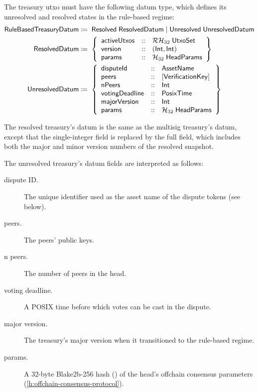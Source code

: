\documentclass[../hydrozoa.tex]{subfiles}
\begin{document}
The treasury utxo must have the following datum type, which defines its unresolved and resolved states in the rule-based regime:
\begin{equation*}
\begin{split}
  \mathsf{RuleBasedTreasuryDatum} &\coloneq\;
    \mathsf{Resolved} \; \mathsf{ResolvedDatum} \mid
    \mathsf{Unresolved} \; \mathsf{UnresolvedDatum} \\
  \mathsf{ResolvedDatum} &\coloneq\;\left\{
    \begin{array}{lll}
      \mathsf{activeUtxos}  &::& \mathcal{RH}_{32} \; \mathsf{UtxoSet} \\
      \mathsf{version} &::& (\mathsf{Int}, \mathsf{Int}) \\
      \mathsf{params} &::& \mathcal{H}_{32} \; \mathsf{HeadParams}
    \end{array}\right\} \\
  \mathsf{UnresolvedDatum} &\coloneq\;\left\{
    \begin{array}{lll}
      \mathsf{disputeId} &::& \mathsf{AssetName} \\
      \mathsf{peers} &::& \mathsf{[VerificationKey]} \\
      \mathsf{nPeers} &::& \mathsf{Int} \\
      \mathsf{votingDeadline} &::& \mathsf{PosixTime} \\
      \mathsf{majorVersion} &::& \mathsf{Int} \\
      \mathsf{params} &::& \mathcal{H}_{32} \; \mathsf{HeadParams}
    \end{array}\right\}
\end{split}
\end{equation*}

The resolved treasury's datum is the same as the multisig treasury's datum, except that the single-integer  field is replaced by the full  field, which includes both the major and minor version numbers of the resolved snapshot.

The unresolved treasury's datum fields are interpreted as follows:
\begin{description}
  \item[dispute ID.] The unique identifier used as the asset name of the dispute tokens (see below).
  \item[peers.] The peers' public keys.
  \item[n peers.] The number of peers in the head.
  \item[voting deadline.] A POSIX time before which votes can be cast in the dispute.
  \item[major version.] The treasury's major version when it transitioned to the rule-based regime.
  \item[params.] A 32-byte Blake2b-256 hash () of the head's offchain consensus parameters (\cref{h:offchain-consensus-protocol}).
\end{description}
\end{document}
